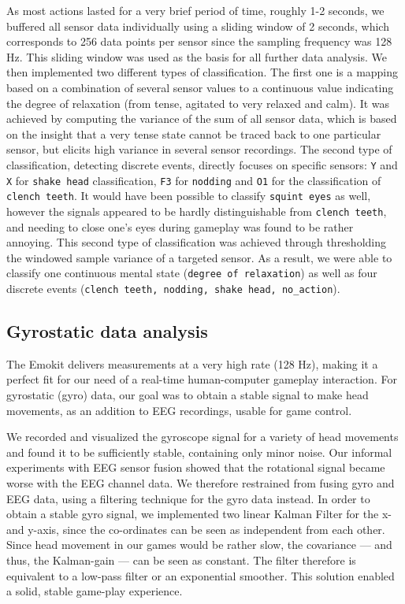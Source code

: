 \documentclass{utue} %
\begin{document}
As most actions lasted for a very brief period of time, roughly 1-2 seconds, we buffered all sensor data individually using a sliding window of 2 seconds, which corresponds to 256 data points per sensor since the sampling frequency was 128 Hz. This sliding window was used as the basis for all further data analysis. We then implemented two different types of classification. The first one is a mapping based on a combination of several sensor values to a continuous value indicating the degree of relaxation (from tense, agitated to very relaxed and calm). It was achieved by computing the variance of the sum of all sensor data, which is based on the insight that a very tense state cannot be traced back to one particular sensor, but elicits high variance in several sensor recordings. The second type of classification, detecting discrete events, directly focuses on specific sensors: 
\texttt{Y} and \texttt{X} for \texttt{shake head} classification, \texttt{F3} for \texttt{nodding} and \texttt{O1} for the classification of \texttt{clench teeth}. It would have been possible to classify \texttt{squint eyes} as well, however the signals appeared to be hardly distinguishable from \texttt{clench teeth}, and needing to close one's eyes during gameplay was found to be rather annoying. This second type of classification was achieved through thresholding the windowed sample variance of a targeted sensor. As a result, we were able to classify one continuous mental state (\texttt{degree of relaxation}) as well as four discrete events (\texttt{clench teeth, nodding, shake head, no\_action}).

\subsection{Gyrostatic data analysis}

The Emokit delivers measurements at a very high rate (128 Hz), making it a perfect fit for our need of a real-time human-computer gameplay interaction. For gyrostatic (gyro) data, our goal was to obtain a stable signal to make head movements, as an addition to EEG recordings, usable for game control.

We recorded and visualized the gyroscope signal for a variety of head movements and found it to be sufficiently stable, containing only minor noise. Our informal experiments with EEG sensor fusion showed that the rotational signal became worse with the EEG channel data. We therefore restrained from fusing gyro and EEG data, using a filtering technique for the gyro data instead. In order to obtain a stable gyro signal, we implemented two linear Kalman Filter for the x- and y-axis, since the co-ordinates can be seen as independent from each other. Since head movement in our games would be rather slow, the covariance --- and thus, the Kalman-gain --- can be seen as constant. The filter therefore is equivalent to a low-pass filter or an exponential smoother. This solution enabled a solid, stable game-play experience.
\end{document}

